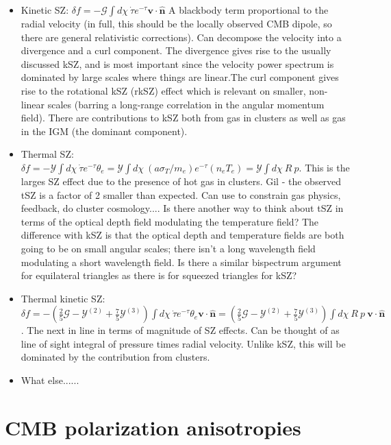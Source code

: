 \documentclass[aps,nofootinbib,groupedaddress]{revtex4}
\begin{document}
\begin{itemize}
\item Kinetic SZ: $\delta f = - \mathcal{G} \int d\chi \ \dot{\tau} e^{-\tau} \mathbf{v} \cdot \mathbf{\hat{n}} $ A blackbody term proportional to the radial velocity (in full, this should be the locally observed CMB dipole, so there are general relativistic corrections). Can decompose the velocity into a divergence and a curl component. The divergence gives rise to the usually discussed kSZ, and is most important since the velocity power spectrum is dominated by large scales where things are linear.The curl component gives rise to the rotational kSZ (rkSZ) effect which is relevant on smaller, non-linear scales (barring a long-range correlation in the angular momentum field). There are contributions to kSZ both from gas in clusters as well as gas in the IGM (the dominant component).
\item Thermal SZ: $\delta f = - \mathcal{Y} \int d\chi \ \dot{\tau} e^{-\tau} \theta_e = \mathcal{Y} \int d\chi \ (a \sigma_T/m_e) e^{-\tau} (n_e T_e) = \mathcal{Y} \int d\chi \ R \ p$. This is the larges SZ effect due to the presence of hot gas in clusters. Gil - the observed tSZ is a factor of 2 smaller than expected. Can use to constrain gas physics, feedback, do cluster cosmology.... Is there another way to think about tSZ in terms of the optical depth field modulating the temperature field? The difference with kSZ is that the optical depth and temperature fields are both going to be on small angular scales; there isn't a long wavelength field modulating a short wavelength field. Is there a similar bispectrum argument for equilateral triangles as there is for squeezed triangles for kSZ?
\item Thermal kinetic SZ: $\delta f = -\left( \frac{2}{5} \mathcal{G} - \mathcal{Y}^{(2)} + \frac{7}{5} \mathcal{Y}^{(3)} \right) \int d\chi \ \dot{\tau} e^{-\tau} \theta_e \mathbf{v} \cdot \mathbf{\hat{n}} = \left( \frac{2}{5} \mathcal{G} - \mathcal{Y}^{(2)} + \frac{7}{5} \mathcal{Y}^{(3)} \right)  \int d\chi \ R \ p \ \mathbf{v} \cdot \mathbf{\hat{n}}$. The next in line in terms of magnitude of SZ effects. Can be thought of as line of sight integral of pressure times radial velocity. Unlike kSZ, this will be dominated by the contribution from clusters.
\item What else......
\end{itemize}



\section{CMB polarization anisotropies}
\end{document}
